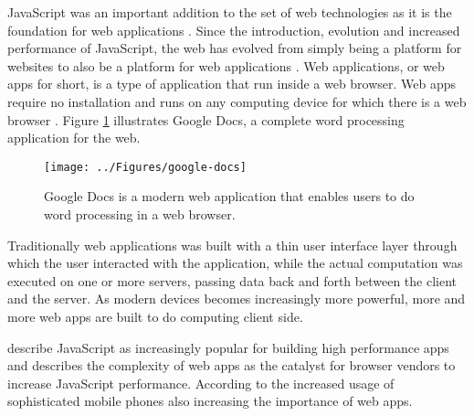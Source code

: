 JavaScript was an important addition to the set of web technologies as it is the foundation for web applications \parencite{ParkJungMoon2015}. Since the introduction, evolution and increased performance of JavaScript, the web has evolved from simply being a platform for websites to also be a platform for web applications \parencite{SandhuHerreraHendren2018}. Web applications, or web apps for short, is a type of application that run inside a web browser. Web apps require no installation and runs on any computing device for which there is a web browser \parencite{RatanaworabhanLivshitsZorn2010}. Figure \ref{google-docs} illustrates Google Docs, a complete word processing application for the web.

\begin{figure}[!h]
\centering
\texttt{[image: ../Figures/google-docs]}
\caption{Google Docs is a modern web application that enables users to do word processing in a web browser.}
\label{google-docs}
\end{figure}

Traditionally web applications was built with a thin user interface layer through which the user interacted with the application, while the actual computation was executed on one or more servers, %
passing data back and forth between the client and the server. As modern devices becomes increasingly more powerful, more and more web apps are built to do computing client side.

\textcite{SandhuHerreraHendren2018} describe JavaScript as increasingly popular for building high performance apps and \textcite{RatanaworabhanLivshitsZorn2010} describes the complexity of web apps as the catalyst for browser vendors to increase JavaScript performance. According to \textcite{RatanaworabhanLivshitsZorn2010} the increased usage of sophisticated mobile phones also increasing the importance of web apps.
